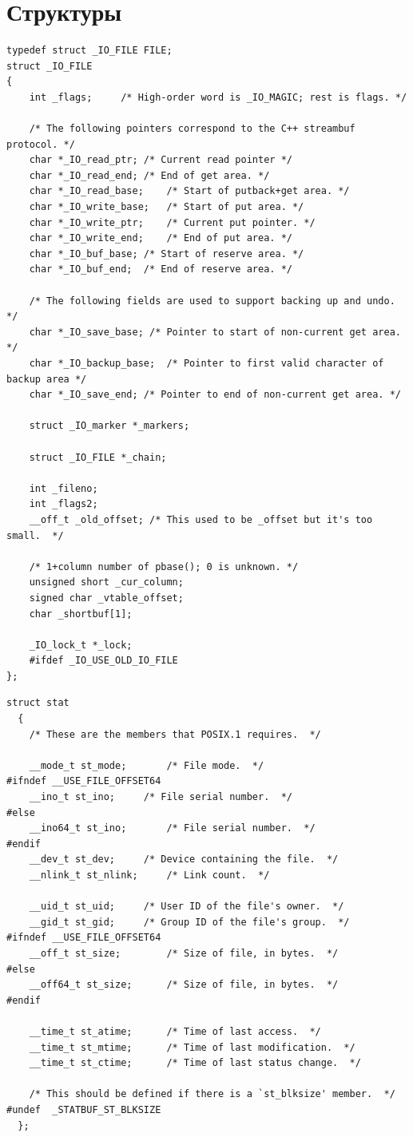 \chapter{Структуры}

\begin{lstlisting}[caption={\text{Структура FILE}}]
typedef struct _IO_FILE FILE;
struct _IO_FILE
{
	int _flags;		/* High-order word is _IO_MAGIC; rest is flags. */
	
	/* The following pointers correspond to the C++ streambuf protocol. */
	char *_IO_read_ptr;	/* Current read pointer */
	char *_IO_read_end;	/* End of get area. */
	char *_IO_read_base;	/* Start of putback+get area. */
	char *_IO_write_base;	/* Start of put area. */
	char *_IO_write_ptr;	/* Current put pointer. */
	char *_IO_write_end;	/* End of put area. */
	char *_IO_buf_base;	/* Start of reserve area. */
	char *_IO_buf_end;	/* End of reserve area. */
	
	/* The following fields are used to support backing up and undo. */
	char *_IO_save_base; /* Pointer to start of non-current get area. */
	char *_IO_backup_base;  /* Pointer to first valid character of backup area */
	char *_IO_save_end; /* Pointer to end of non-current get area. */
	
	struct _IO_marker *_markers;
	
	struct _IO_FILE *_chain;
	
	int _fileno;
	int _flags2;
	__off_t _old_offset; /* This used to be _offset but it's too small.  */
	
	/* 1+column number of pbase(); 0 is unknown. */
	unsigned short _cur_column;
	signed char _vtable_offset;
	char _shortbuf[1];
	
	_IO_lock_t *_lock;
	#ifdef _IO_USE_OLD_IO_FILE
};
\end{lstlisting}

\begin{lstlisting}[caption={\text{Структура stat}}]
	struct stat
  {
    /* These are the members that POSIX.1 requires.  */

    __mode_t st_mode;		/* File mode.  */
#ifndef __USE_FILE_OFFSET64
    __ino_t st_ino;		/* File serial number.  */
#else
    __ino64_t st_ino;		/* File serial number.	*/
#endif
    __dev_t st_dev;		/* Device containing the file.  */
    __nlink_t st_nlink;		/* Link count.  */

    __uid_t st_uid;		/* User ID of the file's owner.  */
    __gid_t st_gid;		/* Group ID of the file's group.  */
#ifndef __USE_FILE_OFFSET64
    __off_t st_size;		/* Size of file, in bytes.  */
#else
    __off64_t st_size;		/* Size of file, in bytes.  */
#endif

    __time_t st_atime;		/* Time of last access.  */
    __time_t st_mtime;		/* Time of last modification.  */
    __time_t st_ctime;		/* Time of last status change.  */

    /* This should be defined if there is a `st_blksize' member.  */
#undef	_STATBUF_ST_BLKSIZE
  };
\end{lstlisting}

